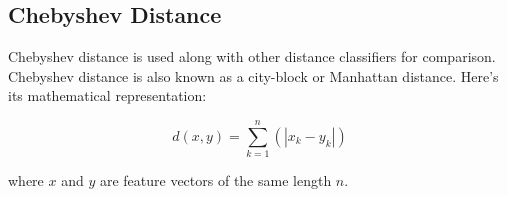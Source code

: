 \subsection{Chebyshev Distance}

Chebyshev distance is used along with other distance classifiers
for comparison. Chebyshev distance is also known as
a city-block or Manhattan distance. Here's its mathematical representation:

$$ d(x,y) = \displaystyle\sum_{k=1}^{n}(|x_{k}-y_{k}|) $$

\noindent
where $x$ and $y$ are feature vectors of the same length $n$.
